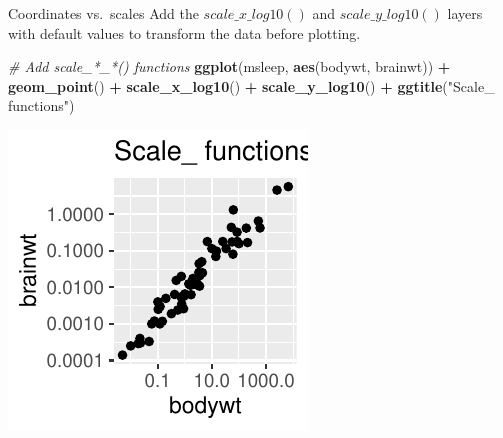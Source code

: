 \documentclass[
  ignorenonframetext,
]{beamer}
\newenvironment{Shaded}{\begin{snugshade}}{\end{snugshade}}
\newcommand{\CommentTok}[1]{\textcolor[rgb]{0.56,0.35,0.01}{\textit{#1}}}
\newcommand{\FunctionTok}[1]{\textcolor[rgb]{0.13,0.29,0.53}{\textbf{#1}}}
\newcommand{\NormalTok}[1]{#1}
\newcommand{\SpecialCharTok}[1]{\textcolor[rgb]{0.81,0.36,0.00}{\textbf{#1}}}
\newcommand{\StringTok}[1]{\textcolor[rgb]{0.31,0.60,0.02}{#1}}
\begin{document}
\begin{frame}[fragile]{Coordinates vs.~scales}
\label{coordinates-vs.-scales-5}
Add the \(scale\_x\_log10()\) and \(scale\_y\_log10()\) layers with
default values to transform the data before plotting.


\begin{Shaded}
\begin{Highlighting}[]
\CommentTok{\# Add scale\_*\_*() functions}
\FunctionTok{ggplot}\NormalTok{(msleep, }\FunctionTok{aes}\NormalTok{(bodywt, brainwt)) }\SpecialCharTok{+} \FunctionTok{geom\_point}\NormalTok{() }\SpecialCharTok{+} \FunctionTok{scale\_x\_log10}\NormalTok{() }\SpecialCharTok{+}
    \FunctionTok{scale\_y\_log10}\NormalTok{() }\SpecialCharTok{+} \FunctionTok{ggtitle}\NormalTok{(}\StringTok{"Scale\_ functions"}\NormalTok{)}
\end{Highlighting}
\end{Shaded}

\begin{center}\includegraphics[width=0.5\linewidth]{Figs/unnamed-chunk-49-1} \end{center}
\end{frame}
\end{document}
